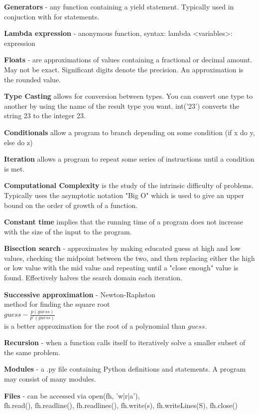 \textbf{Generators} - any function containing a yield statement. Typically used in conjuction with for statements.

\textbf{Lambda expression} - anonymous function, syntax: lambda <variables>: expression

\textbf{Floats} - are approximations of values containing a fractional or decimal amount. May not be exact. Significant digits denote the precision. An approximation is the rounded value.

\textbf{Type Casting} allows for conversion between types. You can convert one type to another by using the name of the result type you want. int('23') converts the string 23 to the integer 23.

\textbf{Conditionals} allow a program to branch depending on some condition (if x do y, else do z)

\textbf{Iteration} allows a program to repeat some series of instructions until a condition is met.

\textbf{Computational Complexity} is the study of the intrinsic difficulty of problems. Typically uses the asymptotic notation "Big O" which is used to give an upper bound on the order of growth of a function.

\textbf{Constant time} implies that the running time of a program does not increase with the size of the input to the program.

\textbf{Bisection search} - approximates by making educated guess at high and low values, checking the midpoint between the two, and then replacing either the high or low value with the mid value and repeating until a "close enough" value is found. Effectively halves the search domain each iteration.

\textbf{Successive approximation} - Newton-Raphston \\ method for finding the square root \\ $guess-\frac{p(guess)}{p'(guess)}$ \\ is a better approximation for the root of a polynomial than $guess$.

\textbf{Recursion} - when a function calls itself to iteratively solve a smaller subset of the same problem.

\textbf{Modules} - a .py file containing Python definitions and statements. A program may consist of many modules.

\textbf{Files} - can be accessed via open(fh, 'w|r|a'), \\ fh.read(), fh.readline(), fh.readlines(), fh.write(s), fh.writeLines(S), fh.close()

